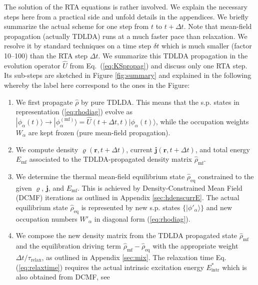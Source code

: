 \documentclass[final,1p]{elsarticle}
\begin{document}
The solution of the RTA equations is rather involved. We explain the
necessary steps here from a practical side and unfold details in the
appendices. We briefly summarize the actual scheme for one step from
$t$ to $t\!+\!\Delta t$.  Note that mean-field propagation (actually
TDLDA) runs at a much faster pace than relaxation.  We resolve it by
standard techniques \cite{Cal00,Rei04aB} on a time step $\delta t$
which is much smaller (factor 10--100) than the RTA step $\Delta
t$. We summarize this TDLDA propagation in the evolution operator
$\hat{U}$ from Eq.~(\ref{eq:KSpropag}) and discuss only one RTA
step. Its sub-steps are sketched in Figure
\ref{fig:summary} and
explained in the following whereby the label here correspond to the
ones in the Figure:
\begin{enumerate}
   \item\label{it:TDLDA} We first propagate $\hat{\rho}$ by pure
     TDLDA.  This means that the s.p. states in representation
     (\ref{eq:rhodiag}) evolve as
     $|\phi_\alpha(t)\rangle\rightarrow
     |\phi_\alpha^\mathrm{(mf)}\rangle=\hat{U}(t+\Delta
     t,t)|\phi_\alpha(t)\rangle$, while the occupation weights
     $W_\alpha$ are kept frozen (pure mean-field propagation).
   \item\label{it:newrho} We compute density
     $\varrho(\mathbf{r},t+\Delta t)$, current
     $\mathbf{j}(\mathbf{r},t+\Delta t)$, and total energy
     $E_\mathrm{mf}$ associated to the TDLDA-propagated density matrix
     $\hat{\rho}_\mathrm{mf}$.
   \item\label{it:DCMF} We determine the thermal mean-field
     equilibrium state $\hat{\rho}_\mathrm{eq}$ constrained to the
     given $\varrho$, $\mathbf{j}$, and $E_\mathrm{mf}$.  This is
     achieved by Density-Constrained Mean Field (DCMF) iterations 
     as outlined in
     Appendix \ref{sec:hdenscurrE}.  The actual equilibrium state
     $\hat{\rho}_\mathrm{eq}$ is represented by new s.p. states
     $\{|\phi'_{\alpha}\rangle\}$ and new occupation numbers $W'_\alpha$
     in diagonal form (\ref{eq:rhodiag}).
   \item \label{it:compo} We compose the new density matrix from the
     TDLDA propagated state $\hat{\rho}_\mathrm{mf}$ and the
     equilibration driving term
     $\hat{\rho}_\mathrm{mf}-\hat{\rho}_\mathrm{eq}$ with the
     appropriate weight $\Delta t/\tau_\mathrm{relax}$, as outlined in
     Appendix \ref{sec:mix}.  The relaxation time
     Eq. (\ref{eq:relaxtime}) requires the actual intrinsic excitation
     energy $E^*_\mathrm{intr}$ which is also obtained from DCMF, see

\end{enumerate}
\end{document}

